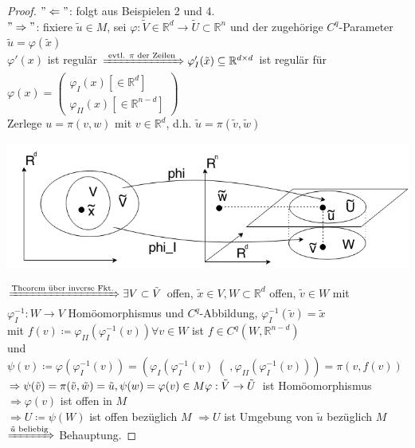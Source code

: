\begin{proof}

$"\Leftarrow"$: folgt aus Beispielen 2 und 4. \\
$"\Rightarrow"$: fixiere $\tilde{u} \in M $, sei $\varphi : \tilde{V} \in \mathbb{R}^d
\rightarrow \tilde{U} \subset \mathbb{R}^n $ und der zugehörige $C^q$-Parameter 
$\tilde{u} = \varphi (\tilde{x})$ \\
$\varphi' (x)$ ist regulär $\xRightarrow{\text{ evtl. $\pi$ der Zeilen }} \varphi_I ' 
(\tilde{x}) \subseteq \mathbb{R}^{d \times d} $ ist regulär für $\varphi (x) =
    \begin{pmatrix}
    \varphi_I (x) \left[ \in \mathbb{R}^d \right]\\
    \varphi_{II} (x) \left[ \in \mathbb{R}^{n-d} \right]
    \end{pmatrix}
$ \\
Zerlege $u = \pi (v,w) $ mit $v \in \mathbb{R}^d $, 
d.h. $\tilde{u} = \pi (\tilde{v},\tilde{w})$\\
\begin{center}
\includegraphics[scale=0.5]{pictures/MA2_0010}\\
\end{center}
$\xRightarrow{\text{Theorem über inverse Fkt.}} \exists V \subset \tilde{V} $ offen,
$\tilde{x} \in V, W \subset \mathbb{R}^d $ offen, $\tilde{v} \in W $
mit $\varphi_I ^{-1} : W \rightarrow V $ Homöomorphismus und $C^q$-Abbildung,
$\varphi_I ^{-1} (\tilde{v}) = \tilde{x} $ \\
mit $f(v) \coloneqq \varphi_{II} \left(\varphi_I ^{-1} (v)\right) \forall v \in W $ ist 
$f \in C^q \left(W, \mathbb{R}^{n-d}\right) $ \\
und $\psi (v) \coloneqq \varphi \left(\varphi_I ^{-1} (v) \right) =
\left( \varphi_I \left(\varphi_I ^{-1} (v) \right( ,
\varphi_{II} \left(\varphi_I ^ {-1} (v) \right) \right) = \pi \left(v, f(v)\right) $ \\
$\Rightarrow \psi (\tilde{v}) = \pi (\tilde{v}, \tilde{w}) = \tilde{u},
\psi (w) = \varphi (v) \in M \\
\varphi : \tilde{V} \rightarrow \tilde{U} $ ist Homöomorphismus \\
$\Rightarrow \varphi (v) $ ist offen in $M$ \\
$ \Rightarrow U \coloneqq \psi (W) $ ist offen bezüglich $M$
$\Rightarrow U $ ist Umgebung von $\tilde{u} $ bezüglich $M$ \\
$\xRightarrow{\tilde{u} \text{ beliebig}} $ Behauptung. 

\end{proof}

